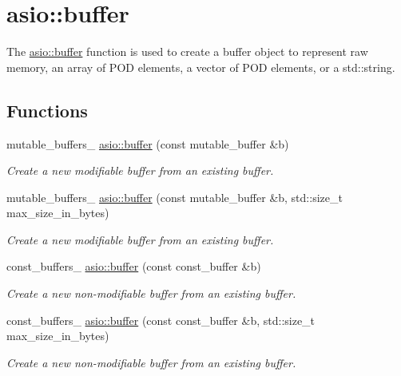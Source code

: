 \hypertarget{group__buffer}{}\section{asio\+:\+:buffer}
\label{group__buffer}


The \hyperlink{group__buffer_ga1ed66e401559cbfd19595392f653b47c}{asio\+::buffer} function is used to create a buffer object to represent raw memory, an array of P\+O\+D elements, a vector of P\+O\+D elements, or a std\+::string.  


\subsection*{Functions}
\begin{DoxyCompactItemize}
\item 
mutable\+\_\+buffers\+\_ \hyperlink{group__buffer_ga1ed66e401559cbfd19595392f653b47c}{asio\+::buffer} (const mutable\+\_\+buffer \&b)
\begin{DoxyCompactList}\small\item\em Create a new modifiable buffer from an existing buffer. \end{DoxyCompactList}\item 
mutable\+\_\+buffers\+\_ \hyperlink{group__buffer_gaf93a06eac8bd6d1db394ba92e260b9fa}{asio\+::buffer} (const mutable\+\_\+buffer \&b, std\+::size\+\_\+t max\+\_\+size\+\_\+in\+\_\+bytes)
\begin{DoxyCompactList}\small\item\em Create a new modifiable buffer from an existing buffer. \end{DoxyCompactList}\item 
const\+\_\+buffers\+\_ \hyperlink{group__buffer_gac00b079c860c589f80a312b975828780}{asio\+::buffer} (const const\+\_\+buffer \&b)
\begin{DoxyCompactList}\small\item\em Create a new non-\/modifiable buffer from an existing buffer. \end{DoxyCompactList}\item 
const\+\_\+buffers\+\_ \hyperlink{group__buffer_gafe2a3b8cbb0e8aefbc870d5f43cf5872}{asio\+::buffer} (const const\+\_\+buffer \&b, std\+::size\+\_\+t max\+\_\+size\+\_\+in\+\_\+bytes)
\begin{DoxyCompactList}\small\item\em Create a new non-\/modifiable buffer from an existing buffer. \end{DoxyCompactList}\item 

\end{DoxyCompactItemize}
